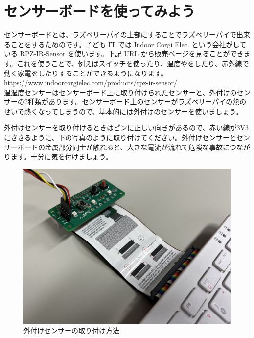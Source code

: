 \newpage
\section{センサーボードを使ってみよう}
センサーボードとは、ラズベリーパイの上部にすることでラズベリーパイで出来ることをするためのです。子ども IT では Indoor Corgi Elec. という会社がしている RPZ-IR-Sensor を使います。下記 URL から販売ページを見ることができます。これを使うことで、例えばスイッチを使ったり、温度やをしたり、赤外線で動く家電をしたりすることができるようになります。\\
\url{https://www.indoorcorgielec.com/products/rpz-ir-sensor/}\\


温湿度センサーはセンサーボード上に取り付けられたセンサーと、外付けのセンサーの2種類があります。センサーボード上のセンサーがラズベリーパイの熱のせいで熱くなってしまうので、基本的には外付けのセンサーを使いましょう。

外付けセンサーを取り付けるときはピンに正しい向きがあるので、赤い線が3V3にささるように、下の写真のように取り付けてください。外付けセンサーとセンサーボードの金属部分同士が触れると、大きな電流が流れて危険な事故につながります。十分に気を付けましょう。

\begin{figure}[H]
    \centering
    \includegraphics[width=0.6\linewidth]{images/chap03/how_to_install_bme280.jpg}
    \caption{外付けセンサーの取り付け方法}
\end{figure}

